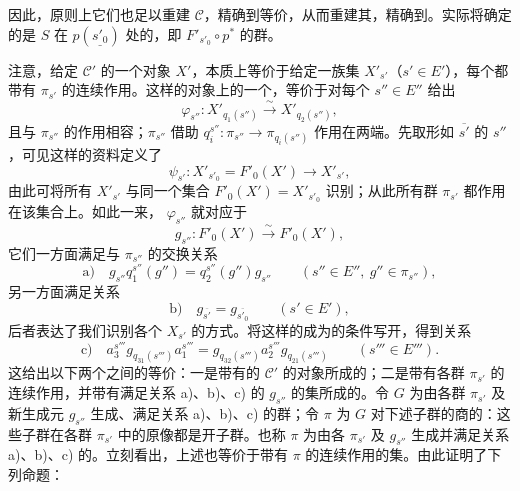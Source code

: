 因此，原则上它们也足以重建 $\mathcal C$，精确到等价，从而重建其，精确到。实际将确定的是 $S$ 在 $p(\underline{s'_0})$ 处的，即 $F'_{s'_0}\circ p^*$ 的群。

注意，给定 $\mathcal C'$ 的一个对象 $X'$，本质上等价于给定一族集 $X'_{s'}$（$s'\in E'$），每个都带有 $\pi_{s'}$ 的连续作用。这样的对象上的一个，等价于对每个 $s''\in E''$ 给出
\[
\varphi_{s''}:X'_{q_1(s'')}\xrightarrow{\sim}X'_{q_2(s'')},
\]
且与 $\pi_{s''}$ 的作用相容；$\pi_{s''}$ 借助 $q_i^{s''}:\pi_{s''}\to\pi_{q_i(s'')}$ 作用在两端。先取形如 $\overline{s'}$ 的 $s''$，可见这样的资料定义了
\[
\psi_{s'}:X'_{s'_0}=F'_0(X')\longrightarrow X'_{s'},
\]
由此可将所有 $X'_{s'}$ 与同一个集合 $F'_0(X')=X'_{s'_0}$ 识别；从此所有群 $\pi_{s'}$ 都作用在该集合上。如此一来， $\varphi_{s''}$ 就对应于
\[
g_{s''}:F'_0(X')\xrightarrow{\sim}F'_0(X'),
\]
它们一方面满足与 $\pi_{s''}$ 的交换关系
\[
\text{a)}\quad
g_{s''}q_1^{s''}(g'')=q_2^{s''}(g'')g_{s''}
\qquad(s''\in E'',\ g''\in\pi_{s''}),
\]
另一方面满足关系
\[
\text{b)}\quad g_{\overline{s'}}=g_{\overline{s'_0}}\qquad(s'\in E'),
\]
后者表达了我们识别各个 $X_{s'}$ 的方式。将这样的成为的条件写开，得到关系
\[
\text{c)}\quad
a_3^{s'''}g_{q_{31}(s''')}a_1^{s'''}
=g_{q_{32}(s''')}a_2^{s'''}g_{q_{21}(s''')}
\qquad(s'''\in E''').
\]
这给出以下两个之间的等价：一是带有的 $\mathcal C'$ 的对象所成的；二是带有各群 $\pi_{s'}$ 的连续作用，并带有满足关系 a)、b)、c) 的 $g_{s''}$ 的集所成的。令 $G$ 为由各群 $\pi_{s'}$ 及新生成元 $g_{s''}$ 生成、满足关系 a)、b)、c) 的群；令 $\pi$ 为 $G$ 对下述子群的商的：这些子群在各群 $\pi_{s'}$ 中的原像都是开子群。也称 $\pi$ 为由各 $\pi_{s'}$ 及 $g_{s''}$ 生成并满足关系 a)、b)、c) 的。立刻看出，上述也等价于带有 $\pi$ 的连续作用的集。由此证明了下列命题：
